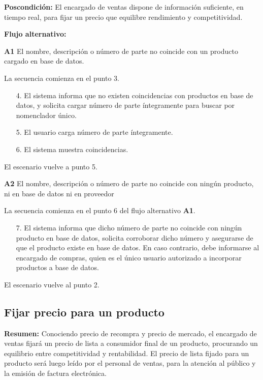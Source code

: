 \textbf{Poscondición:}
El encargado de ventas dispone de información suficiente, en tiempo real, para fijar un precio que equilibre rendimiento y competitividad.

\textbf{Flujo alternativo:}

\textbf{A1} El nombre, descripción o número de parte no coincide con un producto cargado en base de datos.

La secuencia comienza en el punto 3.

\begin{enumerate}
	\item[4.] El sistema informa que no existen coincidencias con productos en base de datos,
	y solicita cargar número de parte íntegramente para buscar por nomenclador único.
	\item[5.] El usuario carga número de parte íntegramente.
	\item[6.] El sistema muestra coincidencias.
\end{enumerate}

El escenario vuelve a punto 5.

\textbf{A2} El nombre, descripción o número de parte no coincide con ningún producto, ni en base de datos ni en proveedor

La secuencia comienza en el punto 6 del flujo alternativo \textbf{A1}.

\begin{enumerate}
	\item [7.] El sistema informa que dicho número de parte no coincide con ningún producto en base de datos,
	solicita corroborar dicho número y asegurarse de que el producto existe en base de datos.
	En caso contrario, debe informarse al encargado de compras, quien es el único usuario autorizado a incorporar productos a base de datos.
\end{enumerate}

El escenario vuelve al punto 2.

\pagebreak

\subsection{Fijar precio para un producto}

\textbf{Resumen:}
Conociendo precio de recompra y precio de mercado,
el encargado de ventas fijará un precio de lista a consumidor final de un producto,
procurando un equilibrio entre competitividad y rentabilidad.
El precio de lista fijado para un producto será luego leído por el personal de ventas,
para la atención al público y la emisión de factura electrónica.

